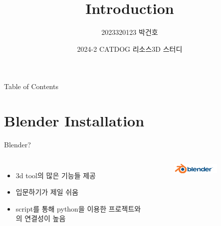 \documentclass[12pt]{beamer}
\title{Introduction}
\author{2023320123 박건호}
\date{2024-2 CATDOG 리소스3D 스터디}
\begin{document}
\maketitle
\begin{frame}{Table of Contents}   
\tableofcontents
\end{frame}

\section{Blender Installation}

\begin{frame}{Blender?}
    \begin{columns}
            \begin{itemize}
                \item 3d tool의 많은 기능들 제공 \newline
                \item 입문하기가 제일 쉬움 \newline
                \item script를 통해 python을 이용한 프로젝트와의 연결성이 높음
            \end{itemize}

            \begin{figure}[t]
            \centering
            \includegraphics[width=0.7\textwidth]{image/blender_icon.png}
            \end{figure}
    \end{columns}
\end{frame}
\end{document}
